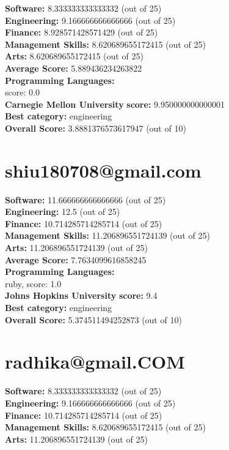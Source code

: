 \documentclass{article}
\begin{document}
\textbf{Software:} 8.333333333333332 (out of 25)\\
\textbf{Engineering: } 9.166666666666666 (out of 25)\\
\textbf{Finance:} 8.928571428571429 (out of 25)\\
\textbf{Management Skills:} 8.620689655172415 (out of 25)\\
\textbf{Arts:} 8.620689655172415 (out of 25)\\
\textbf{Average Score: } 5.889436234263822\\
\textbf{Programming Languages:} \\
score: 0.0\\
\textbf{Carnegie Mellon University} \textbf{score:} 9.950000000000001\\
\textbf{Best category: } engineering\\
\textbf{Overall Score: }3.8881376573617947 (out of 10)\section{shiu180708@gmail.com}
\textbf{Software:} 11.666666666666666 (out of 25)\\
\textbf{Engineering: } 12.5 (out of 25)\\
\textbf{Finance:} 10.714285714285714 (out of 25)\\
\textbf{Management Skills:} 11.206896551724139 (out of 25)\\
\textbf{Arts:} 11.206896551724139 (out of 25)\\
\textbf{Average Score: } 7.7634099616858245\\
\textbf{Programming Languages:} \\
ruby, score: 1.0\\
\textbf{Johns Hopkins University} \textbf{score:} 9.4\\
\textbf{Best category: } engineering\\
\textbf{Overall Score: }5.374511494252873 (out of 10)\section{radhika@gmail.COM}
\textbf{Software:} 8.333333333333332 (out of 25)\\
\textbf{Engineering: } 9.166666666666666 (out of 25)\\
\textbf{Finance:} 10.714285714285714 (out of 25)\\
\textbf{Management Skills:} 8.620689655172415 (out of 25)\\
\textbf{Arts:} 11.206896551724139 (out of 25)\\
\end{document}
